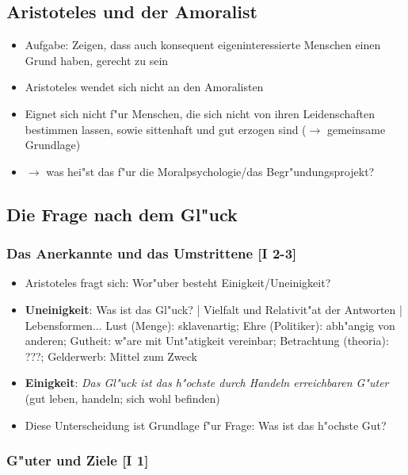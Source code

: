 \documentclass[emulatestandardclasses]{scrartcl}
\begin{document}
\subsection{Aristoteles und der Amoralist}

\begin{itemize}
  \item Aufgabe: Zeigen, dass auch konsequent eigeninteressierte Menschen einen Grund haben, gerecht zu sein
  \item Aristoteles wendet sich nicht an den Amoralisten
  \item Eignet sich nicht f"ur Menschen, die sich nicht von ihren Leidenschaften bestimmen lassen, sowie sittenhaft und gut erzogen sind ($\rightarrow$ gemeinsame Grundlage)
  \item $\rightarrow$ was hei"st das f"ur die Moralpsychologie/das Begr"undungsprojekt?
\end{itemize}

\subsection{Die Frage nach dem Gl"uck}

\subsubsection{Das Anerkannte und das Umstrittene [I 2-3]}

\begin{itemize}
  \item Aristoteles fragt sich: Wor"uber besteht Einigkeit/Uneinigkeit?
  \item \textbf{Uneinigkeit}: Was ist das Gl"uck? | Vielfalt und Relativit"at der Antworten | Lebensformen... Lust (Menge): sklavenartig; Ehre (Politiker): abh"angig von anderen; Gutheit: w"are mit Unt"atigkeit vereinbar; Betrachtung (theoria): ???; Gelderwerb: Mittel zum Zweck
  \item \textbf{Einigkeit}: \emph{Das Gl"uck ist das h"ochste durch Handeln erreichbaren G"uter} (gut leben, handeln; sich wohl befinden)
  \item Diese Unterscheidung ist Grundlage f"ur Frage: Was ist das h"ochste Gut?
\end{itemize}

\subsubsection{G"uter und Ziele [I 1]}
\end{document}
